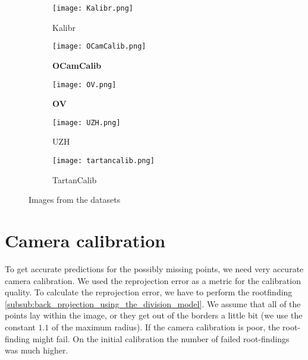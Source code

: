 \begin{figure}[h]
	\centering
	\begin{subfigure}[b]{0.3\linewidth}
		\texttt{[image: Kalibr.png]}
		\caption{Kalibr}
	\end{subfigure}
	\hfill
	\begin{subfigure}[b]{0.3\linewidth}
		\texttt{[image: OCamCalib.png]}
		\caption{\textbf{OCamCalib}}
	\end{subfigure}
	\hfill
	\begin{subfigure}[b]{0.3\linewidth}
		\texttt{[image: OV.png]}
		\caption{\textbf{OV}}
	\end{subfigure}
	\begin{subfigure}[b]{0.3\linewidth}
		\texttt{[image: UZH.png]}
		\caption{UZH}
	\end{subfigure}
	\begin{subfigure}[b]{0.3\linewidth}
		\texttt{[image: tartancalib.png]}
		\caption{TartanCalib}
	\end{subfigure}
	\caption{Images from the datasets}
\end{figure}

\section{Camera calibration}\label{sec:camera_calibration_exp}

\begin{minipage}{0.5\linewidth}
	To get accurate predictions for the possibly missing points, we need
	very accurate camera calibration. We used the reprojection error as a metric
	for the calibration quality.
	To calculate the reprojection error, we have to perform the
	rootfinding \cref{subsub:back_projection_using_the_division_model}. We assume
	that all of the points lay within the image, or they get out of the borders
	a little bit (we use the constant \(1.1\) of the maximum radius). If the
	camera calibration is poor, the root-finding might fail. On the initial
	calibration the number of failed root-findings was much higher.
\end{minipage}
\hfill
\begin{minipage}{0.4\linewidth}
	\captionsetup{width=.9\linewidth}
	\captionsetup{width=.9\linewidth}
\end{minipage}

